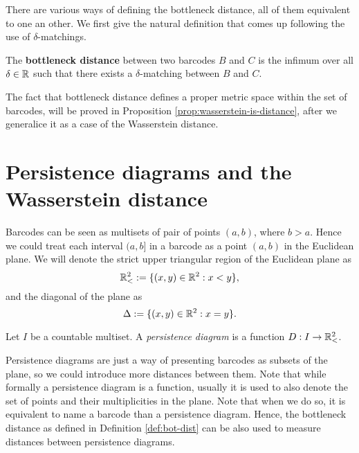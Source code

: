 There are various ways of defining the bottleneck distance, all of them equivalent to one an other. We first give the natural definition that comes up following the use of $\delta$-matchings.

\begin{definition} \label{def:bot-dist}
    The {\bf bottleneck distance} between two barcodes $ B $ and $ C $ is the infimum over all $ \delta \in \mathbb R $ such that there exists a $\delta$-matching between $ B $ and $ C $.
\end{definition}

The fact that bottleneck distance defines a proper metric space within the set of barcodes, will be proved in Proposition \ref{prop:wasserstein-is-distance}, after we generalice it as a case of the Wasserstein distance.

\section{Persistence diagrams and the Wasserstein distance} \label{sec:preliminaries-wp-persistance}

Barcodes can be seen as multisets of pair of points $ (a, b) $, where $ b > a $. Hence we could treat each interval $ (a, b] $ in a barcode as a point $ (a, b) $ in the Euclidean plane. We will denote the strict upper triangular region of the Euclidean plane as
\begin{equation}
   \mathbb{R}_<^2 := \{(x, y) \in \mathbb R^2 : x < y\}, 
\end{equation}
and the diagonal of the plane as
\begin{equation}
    \Delta := \{(x, y) \in \mathbb R^2 : x = y\}.
\end{equation}

\begin{definition}
    Let $ I $ be a countable multiset. A {\it persistence diagram} is a function $ D: I \to \mathbb{R}_<^2 $.
\end{definition}

Persistence diagrams are just a way of presenting barcodes as subsets of the plane, so we could introduce more distances between them. Note that while formally a persistence diagram is a function, usually it is used to also denote the set of points and their multiplicities in the plane. Note that when we do so, it is equivalent to name a barcode than a persistence diagram. Hence, the bottleneck distance as defined in Definition \ref{def:bot-dist} can be also used to measure distances between persistence diagrams.

